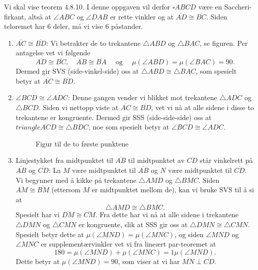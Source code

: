 \begin{oppgave}[4.8.5]
    Vi skal vise teorem 4.8.10. I denne oppgaven vil derfor $\square ABCD$ være en Saccheri-firkant, altså at $\angle ABC$ og $\angle DAB$ er rette vinkler og at $\overline{AD}\cong \overline{BC}$. 
    Siden teloremet har 6 deler, må vi vise 6 påstander. 
    \begin{enumerate}
        \item $\overline{AC}\cong \overline{BD}$: 
        Vi betrakter de to trekantene $\triangle ABD$ og $\triangle BAC$, se figuren. 
        Per antagelse vet vi følgende
        $$\overline{AD}\cong \overline{BC},\quad \overline{AB}\cong \overline{BA}\quad \text{ og } \quad\mu(\angle ABD)=\mu(\angle BAC)=90.$$
        Dermed gir SVS (side-vinkel-side) oss at $\triangle ABD\cong \triangle BAC$, som spesielt betyr at $\overline{AC}\cong \overline{BD}$. 
        
        \item $\angle BCD \cong \angle ADC$: 
        Denne gangen vender vi blikket mot trekantene $\triangle ADC$ og $\triangle BCD$. 
        Siden vi nettopp viste at $\overline{AC}\cong \overline{BD}$, vet vi nå at alle sidene i disse to trekantene er kongruente. 
        Dermed gir SSS (side-side-side) oss at ${triangle ACD}\cong \triangle BDC$, noe som spesielt betyr at $\angle BCD \cong \angle ADC$. 

        \begin{figure}[H]
            \centering
              
            \caption{Figur til de to første punktene}
        \end{figure}

        \item Linjestykket fra midtpunktet til $\overline{AB}$ til midtpunktet av $\overline{CD}$ står vinkelrett på $\overline{AB}$ og $\overline{CD}$: 
        La $M$ være midtpunktet til $\overline{AB}$ og $N$ være midtpunktet til $\overline{CD}$. 
        Vi begynner med å kikke på trekantene $\triangle AMD$ og $\triangle BMC$. 
        Siden $\overline{AM}\cong \overline{BM}$ (ettersom $M$ er midtpunktet mellom de), kan vi bruke SVS til å si at 
        $$\triangle AMD\cong \triangle BMC.$$
        Spesielt har vi $\overline{DM}\cong \overline{CM}$. 
        Fra dette har vi nå at alle sidene i trekantene $\triangle DMN$ og $\triangle CMN$ er kongruente, slik at SSS gir oss at $\triangle DMN \cong \triangle CMN$. 
        Spesielt betyr dette at $\mu(\angle MND)=\mu(\angle MNC)$, og siden $\angle MND$ og $\angle MNC$ er supplementærvinkler vet vi fra lineært par-teoremet at 
        $$ 180 = \mu(\angle MND)+\mu(\angle MNC)=1\mu(\angle MND).$$
        Dette betyr at $\mu(\angle MND)=90$, som viser at vi har $\overline{MN}\perp \overline{CD}$. 
        

\end{enumerate}
\end{oppgave}
